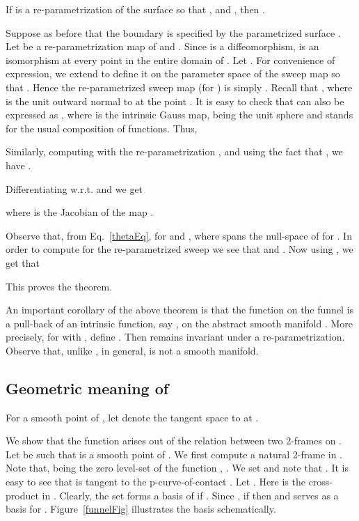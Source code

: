 \documentclass{elsart5p}
\newcommand{\eat}[1]{}
\begin{document}
\begin{thm} \label{thetaInvarThm}
If  is a re-parametrization of the surface  so that , and , then .
\end{thm}
Suppose as before that the boundary  is specified by the parametrized surface .  Let  be a re-parametrization map of  and 
.  Since  is a diffeomorphism,  is an isomorphism at every point in the entire domain of .  Let .  
For convenience of expression, we extend  to define it on the parameter space of the sweep map  so that .  Hence the re-parametrized 
sweep map (for ) is simply .  Recall that ,
 where  is the unit outward normal to  at 
 the point . It is easy to check that  
 can also be expressed as , where 
 is the intrinsic Gauss map,  being the unit sphere  
and  stands for the usual composition of functions.
Thus, 


Similarly, computing with the re-parametrization , and using
the fact that , we have .
\eat{

}
Differentiating w.r.t.  and  we get

where  is the Jacobian of the map .
\eat{. } 

Observe that, from Eq.~\ref{thetaEq}, for  and
, 
where  spans the null-space of  for .  In order to compute  for the re-parametrized sweep we see that  and . 
Now using ,
we get that 

This proves the theorem.
\hfill 

An important corollary of the above theorem is that the function 
on the funnel is a pull-back of an intrinsic 
function, say , on the abstract smooth manifold
.
More precisely, for  with ,
define . Then  remains invariant
under a re-parametrization. Observe that, unlike , in general,
 is not a smooth manifold.


\subsection{Geometric meaning of } \label{geomThetaSec}
For a smooth point  of , let  denote the tangent
space to  at .

We show that the function  arises out of the relation between two 2-frames on . Let  be such that  is a smooth
point of . We first compute a natural 2-frame  in . 
Note that,  being the zero level-set of the function , .  
We set  and note that . It is easy to see that 
 is tangent to the p-curve-of-contact .  
Let .  
Here  is the cross-product in . Clearly, the set  forms a basis of  if 
.  Since , if  then  and  serves as a basis for .
Figure~\ref{funnelFig} illustrates the basis  schematically. 
\end{document}
